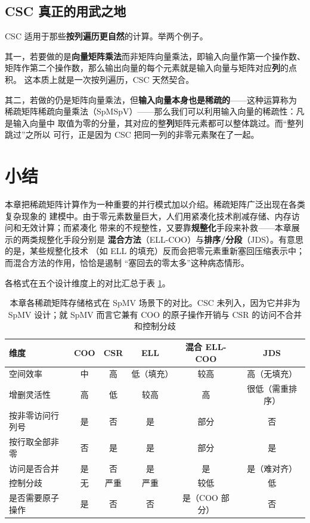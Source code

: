 \subsection*{CSC 真正的用武之地}

CSC 适用于那些\textbf{按列遍历更自然}的计算。举两个例子。

其一，若要做的是\textbf{向量矩阵乘法}而非矩阵向量乘法，即输入向量作第一个操作数、
矩阵作第二个操作数，那么输出向量的每个元素就是输入向量与矩阵对应\textbf{列}的点积。
这本质上就是一次按列遍历，CSC 天然契合。

其二，若做的仍是矩阵向量乘法，但\textbf{输入向量本身也是稀疏的}——这种运算称为
稀疏矩阵稀疏向量乘法（SpMSpV）——那么我们可以利用输入向量的稀疏性：凡是输入向量中
取值为零的分量，其对应的整\textbf{列}矩阵元素都可以整体跳过。而“整列跳过”之所以
可行，正是因为 CSC 把同一列的非零元素聚在了一起。

\section{小结}
\label{sec:spmv-summary}

本章把稀疏矩阵计算作为一种重要的并行模式加以介绍。稀疏矩阵广泛出现在各类复杂现象的
建模中。由于零元素数量巨大，人们用紧凑化技术削减存储、内存访问和无效计算；而紧凑化
带来的不规整性，又要靠\textbf{规整化}手段来补救——本章展示的两类规整化手段分别是
\textbf{混合方法}（ELL-COO）与\textbf{排序/分段}（JDS）。有意思的是，某些规整化技术
（如 ELL 的填充）反而会把零元素重新塞回压缩表示中；而混合方法的作用，恰恰是遏制
“塞回去的零太多”这种病态情形。

各格式在五个设计维度上的对比汇总于表 \ref{tab:17-1}。

\begin{table}[htbp]
  \centering
  \small
  \setlength{\tabcolsep}{4pt}
  \renewcommand{\arraystretch}{1.25}
  \begin{tabular}{l|c|c|c|c|c}
    \hline
    维度 & COO & CSR & ELL & 混合 ELL-COO & JDS\\
    \hline
    空间效率 & 中 & 高 & 低（填充） & 较高 & 高（无填充）\\
    增删灵活性 & 高 & 低 & 较高 & 高 & 很低（需重排序）\\
    按非零访问行列号 & 是 & 否 & 是 & 部分 & 否\\
    按行取全部非零 & 否 & 是 & 是 & 部分 & 是\\
    访问是否合并 & 是 & 否 & 是 & 是 & 是（难对齐）\\
    控制分歧 & 无 & 严重 & 严重 & 较低 & 低\\
    是否需要原子操作 & 是 & 否 & 否 & 是（COO 部分） & 否\\
    \hline
  \end{tabular}
  \caption{本章各稀疏矩阵存储格式在 SpMV 场景下的对比。CSC 未列入，因为它并非为
  SpMV 设计；就 SpMV 而言它兼有 COO 的原子操作开销与 CSR 的访问不合并和控制分歧}
  \label{tab:17-1}
\end{table}

